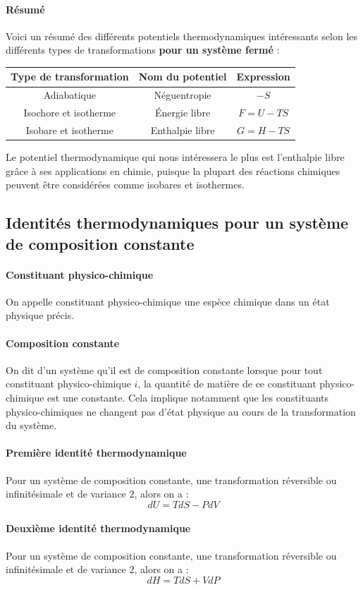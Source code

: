 \documentclass[french]{book}
\theoremstyle{plain}
\theoremstyle{definition}
\theoremstyle{remark}
\begin{document}
\paragraph{Résumé} Voici un résumé des différents potentiels thermodynamiques intéressants selon les différents types de transformations \textbf{pour un système fermé} : 
\begin{center}
	\begin{tabular}{|c|c|c|}
		\hline
		Type de transformation&Nom du potentiel&Expression \\
		\hline
		Adiabatique&Néguentropie&$-S$ \\
		\hline
		Isochore et isotherme&Énergie libre&$F=U-TS$\\
		\hline
		Isobare et isotherme&Enthalpie libre&$G=H-TS$\\
		\hline
	\end{tabular}
\end{center}
Le potentiel thermodynamique qui nous intéressera le plus est l'enthalpie libre grâce à ses applications en chimie, puisque la plupart des réactions chimiques peuvent être considérées comme isobares et isothermes.
\subsection{Identités thermodynamiques pour un système de composition constante}
\paragraph{Constituant physico-chimique} On appelle constituant physico-chimique une espèce chimique dans un état physique précis.
\paragraph{Composition constante} On dit d'un système qu'il est de composition constante lorsque pour tout constituant physico-chimique $i$, la quantité de matière de ce constituant physico-chimique est une constante. Cela implique notamment que les constituants physico-chimiques ne changent pas d'état physique au cours de la transformation du système.
\paragraph{Première identité thermodynamique} Pour un système de composition constante, une transformation réversible ou infinitésimale et de variance $2$, alors on a : $$dU=TdS-PdV$$
\paragraph{Deuxième identité thermodynamique} Pour un système de composition constante, une transformation réversible ou infinitésimale et de variance $2$, alors on a : $$dH=TdS+VdP$$
\end{document}
